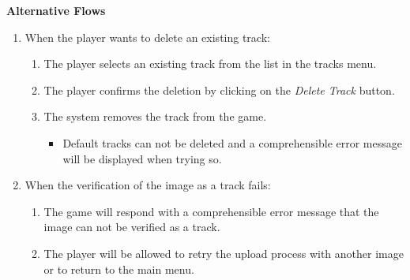 			\textbf{Alternative Flows}
				\begin{enumerate}
					\item When the player wants to delete an existing track:
					\begin{enumerate}
						\item The player selects an existing track from the list in the tracks menu.
						\item The player confirms the deletion by clicking on the \textit{Delete Track} button.
						\item The system removes the track from the game.
						\begin{itemize}
							\item Default tracks can not be deleted and a comprehensible error message will be displayed when trying so.
						\end{itemize}
					\end{enumerate}
					\item When the verification of the image as a track fails:
					\begin{enumerate}
						\item The game will respond with a comprehensible error message that the image can not be verified as a track.
						\item The player will be allowed to retry the upload process with another image or to return to the main menu.
					\end{enumerate}
				\end{enumerate}

